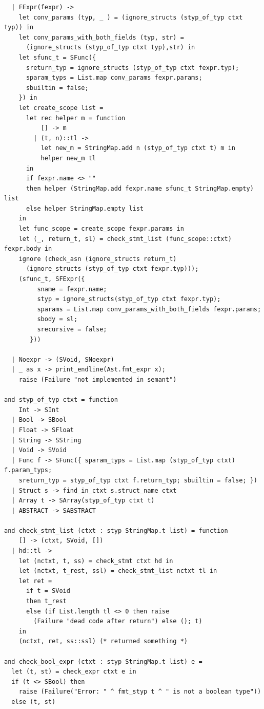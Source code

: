 \documentclass[12pt]{article}
\begin{document}
\begin{mdframed}[hidealllines=true,backgroundcolor=blue!20]
\begin{lstlisting}
  | FExpr(fexpr) ->
    let conv_params (typ, _ ) = (ignore_structs (styp_of_typ ctxt typ)) in
    let conv_params_with_both_fields (typ, str) = 
      (ignore_structs (styp_of_typ ctxt typ),str) in
    let sfunc_t = SFunc({
      sreturn_typ = ignore_structs (styp_of_typ ctxt fexpr.typ);
      sparam_typs = List.map conv_params fexpr.params;
      sbuiltin = false;
    }) in
    let create_scope list =
      let rec helper m = function
          [] -> m
        | (t, n)::tl -> 
          let new_m = StringMap.add n (styp_of_typ ctxt t) m in 
          helper new_m tl
      in
      if fexpr.name <> ""
      then helper (StringMap.add fexpr.name sfunc_t StringMap.empty) list
      else helper StringMap.empty list
    in
    let func_scope = create_scope fexpr.params in
    let (_, return_t, sl) = check_stmt_list (func_scope::ctxt) fexpr.body in
    ignore (check_asn (ignore_structs return_t) 
      (ignore_structs (styp_of_typ ctxt fexpr.typ)));
    (sfunc_t, SFExpr({
         sname = fexpr.name;
         styp = ignore_structs(styp_of_typ ctxt fexpr.typ);
         sparams = List.map conv_params_with_both_fields fexpr.params;
         sbody = sl;
         srecursive = false;
       }))

  | Noexpr -> (SVoid, SNoexpr)
  | _ as x -> print_endline(Ast.fmt_expr x); 
    raise (Failure "not implemented in semant")

and styp_of_typ ctxt = function
    Int -> SInt
  | Bool -> SBool
  | Float -> SFloat
  | String -> SString
  | Void -> SVoid
  | Func f -> SFunc({ sparam_typs = List.map (styp_of_typ ctxt) f.param_typs; 
    sreturn_typ = styp_of_typ ctxt f.return_typ; sbuiltin = false; })
  | Struct s -> find_in_ctxt s.struct_name ctxt
  | Array t -> SArray(styp_of_typ ctxt t) 
  | ABSTRACT -> SABSTRACT

and check_stmt_list (ctxt : styp StringMap.t list) = function
    [] -> (ctxt, SVoid, [])
  | hd::tl -> 
    let (nctxt, t, ss) = check_stmt ctxt hd in
    let (nctxt, t_rest, ssl) = check_stmt_list nctxt tl in
    let ret =
      if t = SVoid
      then t_rest 
      else (if List.length tl <> 0 then raise 
        (Failure "dead code after return") else (); t)
    in
    (nctxt, ret, ss::ssl) (* returned something *)

and check_bool_expr (ctxt : styp StringMap.t list) e = 
  let (t, st) = check_expr ctxt e in
  if (t <> SBool) then 
    raise (Failure("Error: " ^ fmt_styp t ^ " is not a boolean type"))
  else (t, st)


\end{lstlisting}
\end{mdframed}
\end{document}
